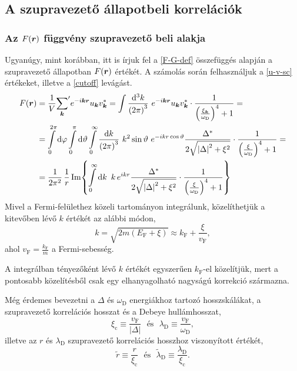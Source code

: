 \documentclass[a4paper,12pt,titlepage]{article}
\newcommand{\KK}{{\vb*{k}}}
\newcommand{\RR}{{\vb*{r}}}
\newcommand{\kF}{{k_\text{F}}}
\newcommand{\EF}{{E_\text{F}}}
\newcommand{\vF}{{v_\text{F}}}
\begin{document}
\subsection{A szupravezető állapotbeli korrelációk}

\subsubsection{Az $F(\RR)$ függvény szupravezető beli alakja}

Ugyanúgy, mint korábban, itt is írjuk fel a \eqref{F-G-def} összefüggés alapján a szupravezető állapotban $F(\RR)$ értékét.  A számolás során felhasználjuk a \eqref{u-v-sc} értékeket, illetve a \eqref{cutoff} levágást.
\begin{equation}
\begin{split}
	F(\RR) & = \frac{1}{V} {\sum\limits_\KK}^\prime e^{-i \KK \RR} u_\KK v_\KK^* = \int \frac{\dd[3]k}{\left( 2 \pi \right)^3} ~ e^{-i \KK \RR} u_\KK v_\KK^* \cdot \frac{1}{\left( \frac{\xi_\KK}{\omega_\text{D}} \right)^4 + 1} = \\
	& = \int\limits_0^{2 \pi} \dd{\varphi} \int\limits_0^\pi \dd{\vartheta} \int\limits_0^\infty \frac{\dd{k}}{\left( 2 \pi \right)^3} ~ k^2 \sin\vartheta ~ e^{-i k r \cos\vartheta} \frac{\Delta^*}{2 \sqrt{\left| \Delta \right|^2 + \xi^2}} \cdot \frac{1}{\left( \frac{\xi}{\omega_\text{D}} \right)^4 + 1} = \\
	& = \frac{1}{2 \pi^2} \, \frac{1}{r} \Im{ \int\limits_0^\infty \dd{k} ~ k \, e^{i k r} \frac{\Delta^*}{2 \sqrt{\left| \Delta \right|^2 + \xi^2}} \cdot \frac{1}{\left( \frac{\xi}{\omega_\text{D}} \right)^4 + 1} }
\end{split}
\end{equation}
Mivel a Fermi-felülethez közeli tartományon integrálunk, közelíthetjük a kitevőben lévő $k$ értékét az alábbi módon,
\begin{equation} \label{k-xi-approx}
	k = \sqrt{2 m \left( \EF + \xi \right)} \approx \kF + \frac{\xi}{\vF},
\end{equation}
ahol $\vF = \frac{\kF}{m}$ a Fermi-sebesség.

A integrálban tényezőként lévő $k$ értékét egyszerűen $\kF$-el közelítjük, mert a pontosabb közelítésből csak egy elhanyagolható nagyságú korrekció származna.

Még érdemes bevezetni a $\Delta$ és $\omega_\text{D}$ energiákhoz tartozó hosszskálákat, a szupravezető korrelációs hosszat és a Debeye hullámhosszat,
\begin{equation}
	\xi_\text{c} \equiv \frac{\vF}{\left| \Delta \right|} ~~~ \text{és} ~~~ \lambda_\text{D} \equiv \frac{\vF}{\omega_\text{D}},
\end{equation}
illetve az $r$ és $\lambda_\text{D}$ szupravezető korrelációs hosszhoz viszonyított értékét,
\begin{equation}
	\tilde{r} \equiv \frac{r}{\xi_\text{c}} ~~~ \text{és} ~~~ \tilde{\lambda}_\text{D} \equiv \frac{\lambda_\text{D}}{\xi_\text{c}}.
\end{equation}
\end{document}
